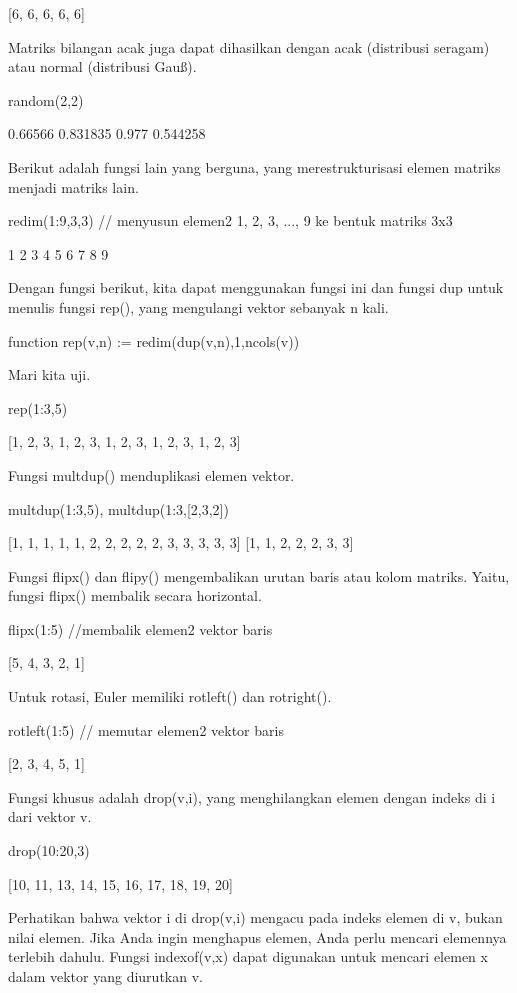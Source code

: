 \documentclass{article}
\begin{document}
    [6,  6,  6,  6,  6]

Matriks bilangan acak juga dapat dihasilkan dengan acak (distribusi
seragam) atau normal (distribusi Gauß).


\>random(2,2)


          0.66566      0.831835 
            0.977      0.544258 

Berikut adalah fungsi lain yang berguna, yang merestrukturisasi elemen
matriks menjadi matriks lain.


\>redim(1:9,3,3) // menyusun elemen2 1, 2, 3, ..., 9 ke bentuk matriks 3x3


                1             2             3 
                4             5             6 
                7             8             9 

Dengan fungsi berikut, kita dapat menggunakan fungsi ini dan fungsi
dup untuk menulis fungsi rep(), yang mengulangi vektor sebanyak n
kali.


\>function rep(v,n) := redim(dup(v,n),1,n\*cols(v))


Mari kita uji.


\>rep(1:3,5)


    [1,  2,  3,  1,  2,  3,  1,  2,  3,  1,  2,  3,  1,  2,  3]

Fungsi multdup() menduplikasi elemen vektor.


\>multdup(1:3,5), multdup(1:3,[2,3,2])


    [1,  1,  1,  1,  1,  2,  2,  2,  2,  2,  3,  3,  3,  3,  3]
    [1,  1,  2,  2,  2,  3,  3]

Fungsi flipx() dan flipy() mengembalikan urutan baris atau kolom
matriks. Yaitu, fungsi flipx() membalik secara horizontal.


\>flipx(1:5) //membalik elemen2 vektor baris


    [5,  4,  3,  2,  1]

Untuk rotasi, Euler memiliki rotleft() dan rotright().


\>rotleft(1:5) // memutar elemen2 vektor baris


    [2,  3,  4,  5,  1]

Fungsi khusus adalah drop(v,i), yang menghilangkan elemen dengan
indeks di i dari vektor v.


\>drop(10:20,3)


    [10,  11,  13,  14,  15,  16,  17,  18,  19,  20]

Perhatikan bahwa vektor i di drop(v,i) mengacu pada indeks elemen di
v, bukan nilai elemen. Jika Anda ingin menghapus elemen, Anda perlu
mencari elemennya terlebih dahulu. Fungsi indexof(v,x) dapat digunakan
untuk mencari elemen x dalam vektor yang diurutkan v.
\end{document}
